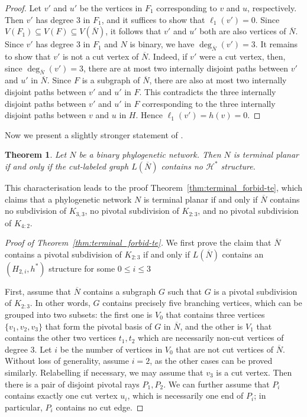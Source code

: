 \documentclass[pdflatex,sn-mathphys-num]{sn-jnl}
\theoremstyle{thmstyleone}%
\newtheorem{theorem}{Theorem}%
\theoremstyle{thmstyletwo}%
\theoremstyle{thmstylethree}%
\begin{document}
\begin{appendices}
\begin{proof}
Let $v'$ and $u'$ be the vertices in $F_1$ corresponding to $v$ and $u$, respectively.  Then $v'$ has degree $3$ in $F_1$, and it suffices to show that $\ell_1(v')=0$. Since $V(F_1)\subseteq V(F)\subseteq V(\overline{N})$, it follows that  $v'$ and $u'$ both are also vertices of $\overline{N}$. Since $v'$ has degree $3$ in $F_1$ and $N$ is binary, we have
$\deg_{\overline{N}}(v')=3.$ It remains to show that $v'$ is not a cut vertex of $\overline{N}$. Indeed, if $v'$ were a cut vertex, then, since $\deg_{\overline{N}}(v')=3$, there are at most two internally disjoint paths between $v'$ and $u'$ in $\overline{N}$. Since $F$ is a subgraph of $\overline{N}$, there are also at most two internally disjoint paths between $v'$ and $u'$ in $F$. This contradicts the three internally disjoint paths between $v'$ and $u'$ in $F$ corresponding to the three internally disjoint paths between $v$ and $u$ in $H$. Hence $\ell_1(v')=h(v)=0$.
\end{proof}


Now we present a slightly stronger statement of \cite[Corollary~5.16]{Miyaji2026}. 

\begin{theorem}
\label{thm:cut-label:str}
Let $N$ be a binary phylogenetic network. Then $N$ is terminal planar if and only if the cut-labeled graph $L(\overline{N})$ contains no $\mathcal H^*$ structure.
\end{theorem}


This characterisation leads to the proof
Theorem~\ref{thm:terminal_forbid-te}, which claims that a phylogenetic network $N$ is terminal planar if and only if  $\overline{N}$ contains no subdivision of $K_{3,3}$, no pivotal subdivision of $K_{2:3}$, and no pivotal subdivision of ${K}_{4:2}$.




\begin{proof}[Proof of Theorem~\ref{thm:terminal_forbid-te}]
We first prove the claim that $\overline{N}$ contains a pivotal subdivision of $K_{2:3}$ if and only if  $L(\overline{N})$ contains an $(H_{2,i},h^*)$ structure for some $0\le i \le 3$


First, assume that $\overline{N}$ contains a subgraph $G$  such that $G$ is a pivotal subdivision of $K_{2:3}$. 
In other words, $G$ contains precisely five branching vertices, which can be grouped into two subsets: the first one is $V_0$ that contains three vertices $\{v_1,v_2,v_3\}$ that form the pivotal basis of $G$ in $\overline{N}$, and the other is $V_1$ that contains the other two vertices $t_1,t_2$ which are necessarily non-cut vertices of degree $3$.  
Let $i$ be the number of vertices in $V_0$ that are not cut vertices of $\overline{N}$. Without loss of generality, assume $i=2$, as the other cases can be proved similarly.
Relabelling if necessary, we may assume that $v_3$ is a cut vertex. Then  there is a pair of disjoint pivotal rays $P_1,P_2$. We can further assume that $P_i$ contains exactly one cut vertex $u_i$, which is necessarily one end of $P_i$; in particular, $P_i$ contains no cut edge.


\end{proof}
\end{appendices}
\end{document}
